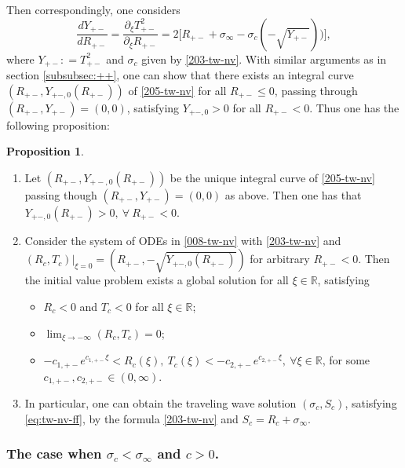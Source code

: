 \documentclass[12pt]{article}
\theoremstyle{definition}
\newtheorem{proposition}[theorem]{Proposition}
\theoremstyle{remark}
\numberwithin{equation}{section}
\begin{document}
Then correspondingly, one considers
\begin{equation}
    \label{205-tw-nv}
    \frac{d Y_{+-}}{d R_{+-}} = \frac{\partial_\xi T_{+-}^2}{\partial_\xi R_{+-}} = 2 \lbrack R_{+-} + \sigma_\infty - \sigma_c( - \sqrt{Y_{+-}}) )\rbrack, 
\end{equation}
where $ Y_{+-} : = T_{+-}^2 $ and $ \sigma_c $ given by \eqref{203-tw-nv}. With similar arguments as in section \ref{subsubsec:++}, one can show that there exists an integral curve $ (R_{+-}, Y_{+-,0}(R_{+-})) $ of \eqref{205-tw-nv} for all $ R_{+-} \leq 0 $,  passing through $ (R_{+-}, Y_{+-}) = (0,0) $, satisfying  $ Y_{+-,0} > 0 $ for all $ R_{+-} < 0 $. Thus one has the following proposition:
\begin{proposition}
    \label{prop:tw+-}
    \begin{enumerate}
    \item Let $ (R_{+-}, Y_{{+-},0}(R_{+-}) ) $ be the unique integral curve of \eqref{205-tw-nv} passing though $ (R_{+-}, Y_{+-}) = (0,0) $ as above. Then one has that $ Y_{+-,0}(R_{+-}) > 0, \ \forall \ R_{+-} < 0 $.   

    \item 
    Consider the system of ODEs in \eqref{008-tw-nv} with \eqref{203-tw-nv} and $ (R_c, T_c)\vert_{\xi = 0} = (R_{+-}, -\sqrt{Y_{+-,0}(R_{+-})}) $ for arbitrary $ R_{+-} < 0 $. 
    Then the initial value problem exists a global solution for all $ \xi \in \mathbb R $, satisfying
    \begin{itemize}
        \item $ R_c < 0 $ and $ T_c < 0 $ for all $ \xi \in \mathbb R $; 
        \item $ \lim_{\xi\rightarrow -\infty} (R_c, T_c) = 0 $;
        \item $ -c_{1,+-} e^{ c_{1,+-} \xi} < R_c(\xi) , \ T_c(\xi) < -c_{2,+-} e^{ c_{2,+-} \xi}, \ \forall \xi \in \mathbb R $, for some $ c_{1,+-}, c_{2,+-} \in (0,\infty) $. 
    \end{itemize}

    \item
    In particular, one can obtain the traveling wave solution $ (\sigma_c, S_c) $, satisfying \eqref{eq:tw-nv-ff}, by the formula \eqref{203-tw-nv} and $ S_c = R_c + \sigma_\infty $. 
    \end{enumerate}
\end{proposition}

    
\subsubsection{The case when $ \sigma_c < \sigma_\infty $ and $ c > 0 $.}\label{subsubsec:-+}
\end{document}
